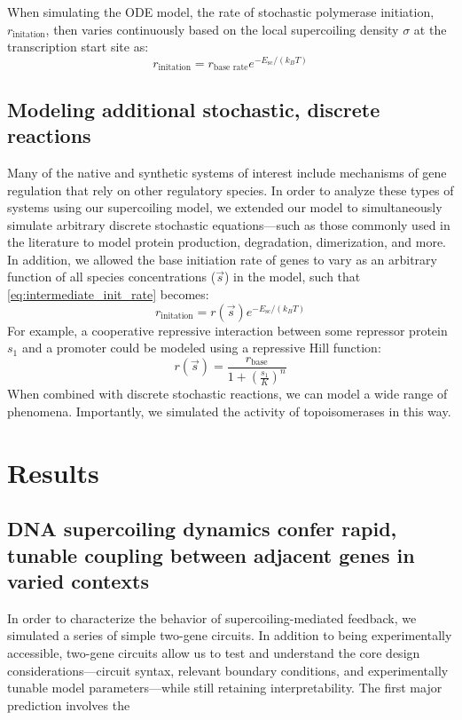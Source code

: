 \documentclass[11pt]{article}
\begin{document}
When simulating the ODE model, the rate of stochastic polymerase initiation, \(r_\text{initation}\), then varies continuously based on the local supercoiling density \(\sigma\) at the transcription start site as:
\begin{equation}
    r_\text{initation} = r_\text{base rate} e^{- E_\text{sc} / (k_B T)}
\label{eq:intermediate_init_rate}
\end{equation}


\subsection{Modeling additional stochastic, discrete reactions}
Many of the native and synthetic systems of interest include mechanisms of gene regulation that rely on other regulatory species. In order to analyze these types of systems using our supercoiling model, we extended our model to simultaneously simulate arbitrary discrete stochastic equations---such as those commonly used in the literature to model protein production, degradation, dimerization, and more.
In addition, we allowed the base initiation rate of genes to vary as an arbitrary function of all species concentrations (\(\vec s\)) in the model, such that \cref{eq:intermediate_init_rate} becomes:
\begin{equation}
    r_\text{initation} = r(\vec s) e^{- E_\text{sc} / (k_B T)}
\label{eq:final_init_rate}
\end{equation}
For example, a cooperative repressive interaction between some repressor protein \(s_1\) and a promoter could be modeled using a repressive Hill function:
\[
    r(\vec s) = \frac{r_\text{base}}{1 + \left(\frac{s_1}{K}\right)^n}
\]
When combined with discrete stochastic reactions, we can model a wide range of phenomena. Importantly, we simulated the activity of topoisomerases in this way.

\section{Results}

\subsection{DNA supercoiling dynamics confer rapid, tunable coupling between adjacent genes in varied contexts}
In order to characterize the behavior of supercoiling-mediated feedback, we simulated a series of simple two-gene circuits. In addition to being experimentally accessible, two-gene circuits allow us to test and understand the core design considerations---circuit syntax, relevant boundary conditions, and experimentally tunable model parameters---while still retaining interpretability.
The first major prediction involves the
\end{document}
